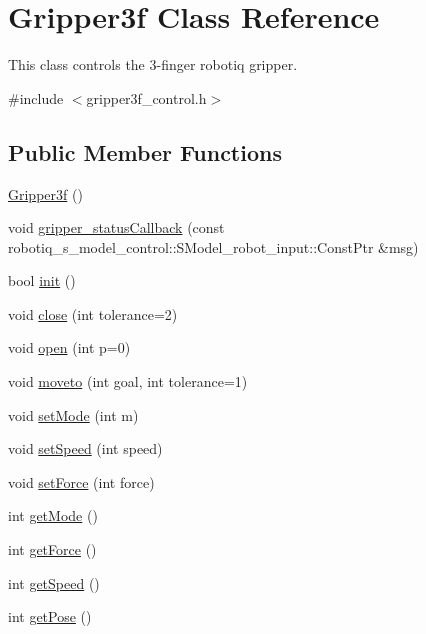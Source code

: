 \hypertarget{class_gripper3f}{}\section{Gripper3f Class Reference}
\label{class_gripper3f}


This class controls the 3-\/finger robotiq gripper.  




{\ttfamily \#include $<$gripper3f\+\_\+control.\+h$>$}

\subsection*{Public Member Functions}
\begin{DoxyCompactItemize}
\item 
\hyperlink{class_gripper3f_ab7fedc88e7c52bc7490dbeae904f6b84}{Gripper3f} ()
\item 
void \hyperlink{class_gripper3f_a754aca6d83e6794de0fc955c9ff7364c}{gripper\+\_\+status\+Callback} (const robotiq\+\_\+s\+\_\+model\+\_\+control\+::\+S\+Model\+\_\+robot\+\_\+input\+::\+Const\+Ptr \&msg)
\item 
bool \hyperlink{class_gripper3f_acbc07a486b491fed1d849b49332357a6}{init} ()
\item 
void \hyperlink{class_gripper3f_aabda51ba43f1c7fa9382a205dd7cc942}{close} (int tolerance=2)
\item 
void \hyperlink{class_gripper3f_a006fce20ba7d4299c2fdd7918b9fb5ab}{open} (int p=0)
\item 
void \hyperlink{class_gripper3f_a16d4a057cb90e5c700d28326ac757181}{moveto} (int goal, int tolerance=1)
\item 
void \hyperlink{class_gripper3f_a3517993257d2b49a4304af9f3b652231}{set\+Mode} (int m)
\item 
void \hyperlink{class_gripper3f_a4fb3e4d4400eed694bdab7d5c2d3cd19}{set\+Speed} (int speed)
\item 
void \hyperlink{class_gripper3f_afbf314c1f603c9ad89c12c1805c66b43}{set\+Force} (int force)
\item 
int \hyperlink{class_gripper3f_a8e006806547d5346bc30af96f994c852}{get\+Mode} ()
\item 
int \hyperlink{class_gripper3f_a2954e4bfaaeee810142511478637468d}{get\+Force} ()
\item 
int \hyperlink{class_gripper3f_a9bbb54ceebac6d20d3c3e27d61c6fe64}{get\+Speed} ()
\item 
int \hyperlink{class_gripper3f_a9b8bf9829bf600142d2b28ef05211ed8}{get\+Pose} ()
\end{DoxyCompactItemize}


